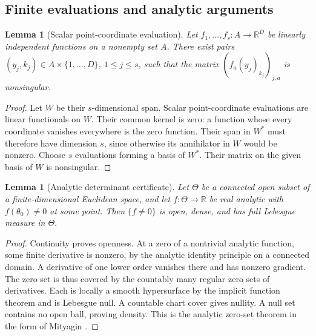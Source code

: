 \documentclass[11pt,a4paper]{article}
\numberwithin{equation}{section}
\newtheorem{lemma}[theorem]{Lemma}
\theoremstyle{definition}
\theoremstyle{remark}
\newcommand{\R}{\mathbb R}
\begin{document}
\subsection{Finite evaluations and analytic arguments}
\begin{lemma}[Scalar point-coordinate evaluation]\label{lem:evaluation}
Let $f_1,\ldots,f_s:A\to\R^D$ be linearly independent functions on a
nonempty set $A$. There exist pairs $(y_j,k_j)\in A\times\{1,\ldots,D\}$,
$1\leq j\leq s$, such that the matrix
$(f_a(y_j)_{k_j})_{j,a}$ is nonsingular.
\end{lemma}
\begin{proof}
Let $W$ be their $s$-dimensional span. Scalar point-coordinate evaluations
are linear functionals on $W$. Their common kernel is zero: a function whose
every coordinate vanishes everywhere is the zero function. Their span in
$W^*$ must therefore have dimension $s$, since otherwise its annihilator
in $W$ would be nonzero. Choose $s$ evaluations forming a basis of $W^*$.
Their matrix on the given basis of $W$ is nonsingular.
\end{proof}

\begin{lemma}[Analytic determinant certificate]\label{lem:analytic}
Let $\Theta$ be a connected open subset of a finite-dimensional Euclidean
space, and let $f:\Theta\to\R$ be real analytic with $f(\theta_0)\ne0$
at some point. Then $\{f\ne0\}$ is open, dense, and has full Lebesgue
measure in $\Theta$.
\end{lemma}
\begin{proof}
Continuity proves openness. At a zero of a nontrivial analytic function,
some finite derivative is nonzero, by the analytic identity principle on a
connected domain. A derivative of one lower order vanishes there and has
nonzero gradient. The zero set is thus covered by the countably many
regular zero sets of derivatives. Each is locally a smooth hypersurface by
the implicit function theorem and is Lebesgue null. A countable chart cover
gives nullity. A null set contains no open ball, proving density. This is
the analytic zero-set theorem in the form of Mityagin \cite{Mityagin}.
\end{proof}
\end{document}
